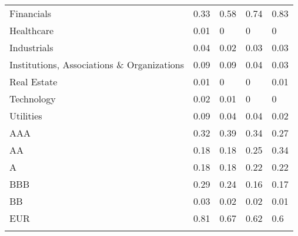 \begin{table}[H]
\begin{tabular}{lllll}
Financials & \cellcolor[HTML]{C5E6D0}0.33 & \cellcolor[HTML]{9BD5AB}0.58 & \cellcolor[HTML]{80CA94}0.74 & \cellcolor[HTML]{71C487}0.83 \\
Healthcare & \cellcolor[HTML]{FBFCFE}0.01 & \cellcolor[HTML]{FCFCFF}0 & \cellcolor[HTML]{FCFCFF}0 & \cellcolor[HTML]{FCFCFF}0 \\
Industrials & \cellcolor[HTML]{F6FAFA}0.04 & \cellcolor[HTML]{F9FBFD}0.02 & \cellcolor[HTML]{F7FAFB}0.03 & \cellcolor[HTML]{F7FAFB}0.03 \\
Institutions,   Associations \& Organizations & \cellcolor[HTML]{EDF6F2}0.09 & \cellcolor[HTML]{EDF6F2}0.09 & \cellcolor[HTML]{F6FAFA}0.04 & \cellcolor[HTML]{F7FAFB}0.03 \\
Real Estate & \cellcolor[HTML]{FBFCFE}0.01 & \cellcolor[HTML]{FCFCFF}0 & \cellcolor[HTML]{FCFCFF}0 & \cellcolor[HTML]{FBFCFE}0.01 \\
Technology & \cellcolor[HTML]{F9FBFD}0.02 & \cellcolor[HTML]{FBFCFE}0.01 & \cellcolor[HTML]{FCFCFF}0 & \cellcolor[HTML]{FCFCFF}0 \\
Utilities & \cellcolor[HTML]{EDF6F2}0.09 & \cellcolor[HTML]{F6FAFA}0.04 & \cellcolor[HTML]{F6FAFA}0.04 & \cellcolor[HTML]{F9FBFD}0.02 \\
AAA & \cellcolor[HTML]{C7E7D1}0.32 & \cellcolor[HTML]{BBE2C7}0.39 & \cellcolor[HTML]{C3E5CE}0.34 & \cellcolor[HTML]{CFEAD8}0.27 \\
AA & \cellcolor[HTML]{DEF0E5}0.18 & \cellcolor[HTML]{DEF0E5}0.18 & \cellcolor[HTML]{D2EBDB}0.25 & \cellcolor[HTML]{C3E5CE}0.34 \\
A & \cellcolor[HTML]{DEF0E5}0.18 & \cellcolor[HTML]{DEF0E5}0.18 & \cellcolor[HTML]{D8EEE0}0.22 & \cellcolor[HTML]{D8EEE0}0.22 \\
BBB & \cellcolor[HTML]{CCE9D5}0.29 & \cellcolor[HTML]{D4ECDD}0.24 & \cellcolor[HTML]{E2F2E8}0.16 & \cellcolor[HTML]{E0F1E7}0.17 \\
BB & \cellcolor[HTML]{F7FAFB}0.03 & \cellcolor[HTML]{F9FBFD}0.02 & \cellcolor[HTML]{F9FBFD}0.02 & \cellcolor[HTML]{FBFCFE}0.01 \\
EUR & \cellcolor[HTML]{74C58A}0.81 & \cellcolor[HTML]{8CCF9E}0.67 & \cellcolor[HTML]{94D2A6}0.62 & \cellcolor[HTML]{98D4A8}0.6 \\
\hline \\[-1.8ex] 
\end{tabular}
\end{table}